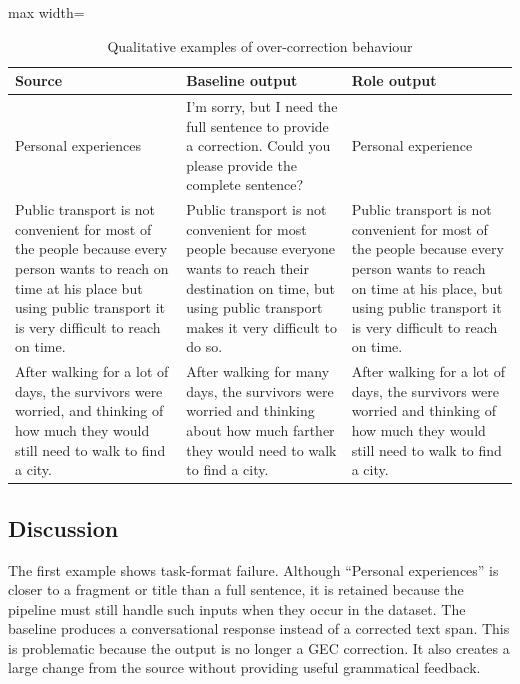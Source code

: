 \begin{table}[htbp]
    \centering
    \caption{Qualitative examples of over-correction behaviour}
    \label{tab:qualitative_examples}
    \renewcommand{\arraystretch}{1.25}
    \begin{adjustbox}{max width=\textwidth}
    \begin{tabularx}{\textwidth}{
        >{\raggedright\arraybackslash}p{}
        >{\raggedright\arraybackslash}p{}
        >{\raggedright\arraybackslash}p{}
    }
        \toprule
        \textbf{Source} & \textbf{Baseline output} & \textbf{Role output} \\
        \midrule
        Personal experiences
        & I'm sorry, but I need the full sentence to provide a correction. Could you please provide the complete sentence?
        & Personal experience \\
        \addlinespace

        Public transport is not convenient for most of the people because every person wants to reach on time at his place but using public transport it is very difficult to reach on time.
        & Public transport is not convenient for most people because everyone wants to reach their destination on time, but using public transport makes it very difficult to do so.
        & Public transport is not convenient for most of the people because every person wants to reach on time at his place, but using public transport it is very difficult to reach on time. \\
        \addlinespace

        After walking for a lot of days, the survivors were worried, and thinking of how much they would still need to walk to find a city.
        & After walking for many days, the survivors were worried and thinking about how much farther they would need to walk to find a city.
        & After walking for a lot of days, the survivors were worried and thinking of how much they would still need to walk to find a city. \\
        \bottomrule
    \end{tabularx}
    \end{adjustbox}
\end{table}

\subsection{Discussion}

The first example shows task-format failure. Although ``Personal experiences'' is closer to a fragment or title than a full sentence, it is retained because the pipeline must still handle such inputs when they occur in the dataset. The baseline produces a conversational response instead of a corrected text span. This is problematic because the output is no longer a GEC correction. It also creates a large change from the source without providing useful grammatical feedback.

